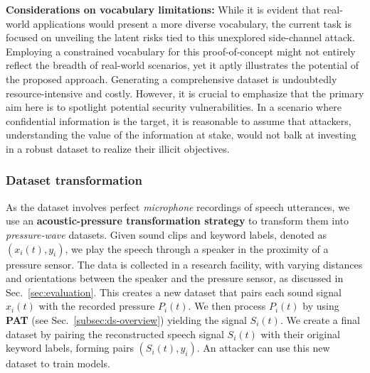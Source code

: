\textbf{Considerations on vocabulary limitations:} While it is evident that real-world applications would present a more diverse vocabulary, the current task is focused on unveiling the latent risks tied to this unexplored side-channel attack. Employing a constrained vocabulary for this proof-of-concept might not entirely reflect the breadth of real-world scenarios, yet it aptly illustrates the potential of the proposed approach. Generating a comprehensive dataset is undoubtedly resource-intensive and costly. However, it is crucial to emphasize that the primary aim here is to spotlight potential security vulnerabilities. {In a scenario where confidential information is the target, it is reasonable to assume that attackers, understanding the value of the information at stake, would not balk at investing in a robust dataset to realize their illicit objectives.}



\subsubsection{\textbf{Dataset transformation}}
As the dataset involves perfect \textit{microphone} recordings of speech utterances, we use an \textbf{{acoustic-pressure transformation strategy}} to transform them into \textit{pressure-wave} datasets.
Given sound clips and keyword labels, denoted as $(x_i(t), y_i)$, we play the speech through a speaker in the proximity of a pressure sensor.  The data is collected in a research facility, with varying distances and orientations between the speaker and the pressure sensor, as discussed in Sec.~\ref{sec:evaluation}.
This creates a new dataset that pairs each sound signal $x_i(t)$ with the recorded pressure $P_i(t)$. 
We then process $P_i(t)$ by using \textbf{{PAT}} (see Sec.~\ref{subsec:ds-overview}) yielding the signal ${S_i}(t)$. We create a final dataset by pairing the reconstructed speech signal ${S_i}(t)$ with their original keyword labels, forming pairs $({S_i}(t), y_i)$.
An attacker can use this new dataset to train models.

